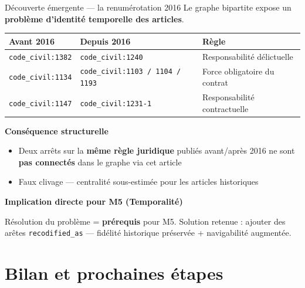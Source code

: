 \documentclass[aspectratio=169,10pt]{beamer}
\newcommand{\keybox}[1]{%
  \begin{center}
  \colorbox{accentsoft}{\parbox{0.92\linewidth}{\centering #1}}
  \end{center}}
\begin{document}
\begin{frame}{Découverte émergente --- la renumérotation 2016}
  Le graphe bipartite expose un \textbf{problème d'identité temporelle des articles}.

  \vspace{0.3em}
  \footnotesize
  \begin{tabular}{@{}l l l@{}}
    \toprule
    \textbf{Avant 2016} & \textbf{Depuis 2016} & \textbf{Règle} \\
    \midrule
    \texttt{code\_civil:1382} & \texttt{code\_civil:1240} & Responsabilité délictuelle \\
    \texttt{code\_civil:1134} & \texttt{code\_civil:1103 / 1104 / 1193} & Force obligatoire du contrat \\
    \texttt{code\_civil:1147} & \texttt{code\_civil:1231-1} & Responsabilité contractuelle \\
    \bottomrule
  \end{tabular}

  \vspace{0.5em}
  \textbf{Conséquence structurelle}
  \begin{itemize}\footnotesize
    \item Deux arrêts sur la \textbf{même règle juridique} publiés avant/après 2016 ne sont \textbf{pas connectés} dans le graphe via cet article
    \item Faux clivage --- centralité sous-estimée pour les articles historiques
  \end{itemize}

  \vspace{0.3em}
  \textbf{Implication directe pour M5 (Temporalité)}
  \keybox{\small Résolution du problème = \textbf{prérequis} pour M5. Solution retenue : ajouter des arêtes \texttt{recodified\_as} --- fidélité historique préservée + navigabilité augmentée.}
\end{frame}

\section{Bilan et prochaines étapes}
\end{document}

